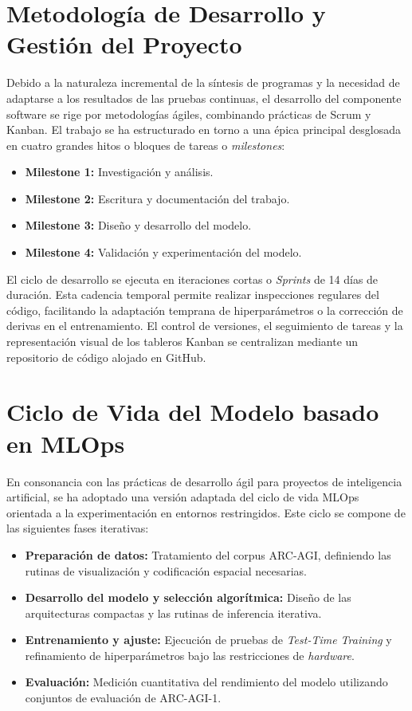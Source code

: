 \documentclass[11pt,a4paper,spanish]{book}
\numberwithin{equation}{chapter}
\numberwithin{figure}{chapter}
\begin{document}
\section{Metodología de Desarrollo y Gestión del Proyecto}

Debido a la naturaleza incremental de la síntesis de programas y la necesidad de adaptarse a los resultados de las pruebas continuas, el desarrollo del componente software se rige por metodologías ágiles, combinando prácticas de Scrum y Kanban.
El trabajo se ha estructurado en torno a una épica principal desglosada en cuatro grandes hitos o bloques de tareas o \textit{milestones}:

\begin{itemize}
	\item \textbf{Milestone 1:} Investigación y análisis.
	\item \textbf{Milestone 2:} Escritura y documentación del trabajo.
	\item \textbf{Milestone 3:} Diseño y desarrollo del modelo.
	\item \textbf{Milestone 4:} Validación y experimentación del modelo.
\end{itemize}

El ciclo de desarrollo se ejecuta en iteraciones cortas o \textit{Sprints} de 14 días de duración. Esta cadencia temporal permite realizar inspecciones regulares del código, 
facilitando la adaptación temprana de hiperparámetros o la corrección de derivas en el entrenamiento. El control de versiones, el seguimiento de tareas y la representación visual de los tableros 
Kanban se centralizan mediante un repositorio de código alojado en GitHub.

\section{Ciclo de Vida del Modelo basado en MLOps}

En consonancia con las prácticas de desarrollo ágil para proyectos de inteligencia artificial, se ha adoptado una versión adaptada del ciclo de vida MLOps orientada a la experimentación en entornos restringidos. 
Este ciclo se compone de las siguientes fases iterativas:

\begin{itemize}
	\item \textbf{Preparación de datos:} Tratamiento del corpus ARC-AGI, definiendo las rutinas de visualización y codificación espacial necesarias.
	\item \textbf{Desarrollo del modelo y selección algorítmica:} Diseño de las arquitecturas compactas y las rutinas de inferencia iterativa.
	\item \textbf{Entrenamiento y ajuste:} Ejecución de pruebas de \textit{Test-Time Training} y refinamiento de hiperparámetros bajo las restricciones de \textit{hardware}.
	\item \textbf{Evaluación:} Medición cuantitativa del rendimiento del modelo utilizando conjuntos de evaluación de ARC-AGI-1.
\end{itemize}
\end{document}
